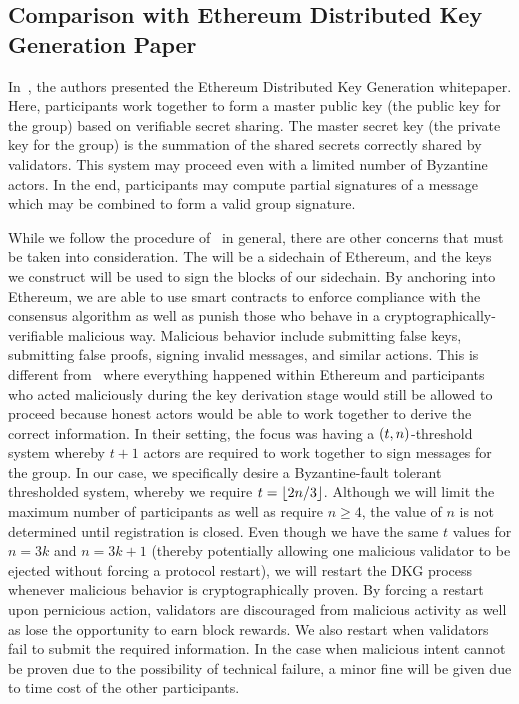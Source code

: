 \subsection{Comparison with Ethereum Distributed Key Generation Paper}
\label{ssec:ethdkg_comparison}

In~\cite{ethdkg}, the authors presented the Ethereum
Distributed Key Generation whitepaper.
Here, participants work together to form a master public key
(the public key for the group)
based on verifiable secret sharing.
The master secret key (the private key for the group)
is the summation of the shared secrets correctly shared by
validators.
This system may proceed even with a limited number of Byzantine actors.
In the end, participants may compute partial signatures of a message
which may be combined to form a valid group signature.

While we follow the procedure of~\cite{ethdkg} in general,
there are other concerns that must be taken into consideration.
The \LayerTwo{} will be a sidechain of Ethereum,
and the keys we construct will be used to sign the blocks of our sidechain.
By anchoring into Ethereum, we are able to use smart contracts to enforce
compliance with the consensus algorithm as well as punish
those who behave in a cryptographically-verifiable malicious way.
Malicious behavior include submitting false keys, submitting
false proofs, signing invalid messages, and similar actions.
This is different from~\cite{ethdkg} where everything
happened within Ethereum and participants who
acted maliciously during the key derivation stage would still
be allowed to proceed because honest actors would be able to
work together to derive the correct information.
In their setting, the focus was having a $\left( t,n \right)$-threshold
system whereby $t+1$ actors are required to work together to
sign messages for the group.
In our case, we specifically desire a Byzantine-fault tolerant
thresholded system, whereby we require $t = \left\lfloor 2n/3 \right\rfloor$.
Although we will limit the maximum number of participants
as well as require $n\ge4$, the value of $n$ is not determined
until registration is closed.
Even though we have the same $t$ values for $n = 3k$ and $n = 3k+1$
(thereby potentially allowing one malicious validator to be
ejected without forcing a protocol restart),
we will restart the DKG process whenever malicious behavior
is cryptographically proven.
By forcing a restart upon pernicious action,
validators are discouraged from malicious activity as well
as lose the opportunity to earn block rewards.
We also restart when validators fail to submit the required
information.
In the case when malicious intent cannot be proven due to
the possibility of technical failure, a minor fine will be
given due to time cost of the other participants.

